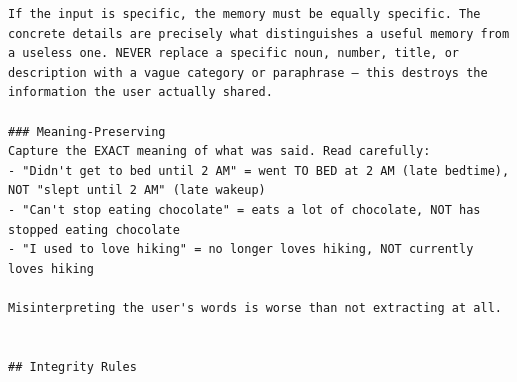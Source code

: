\documentclass[11pt]{article}
\begin{document}
\begin{lstlisting}
If the input is specific, the memory must be equally specific. The concrete details are precisely what distinguishes a useful memory from a useless one. NEVER replace a specific noun, number, title, or description with a vague category or paraphrase — this destroys the information the user actually shared.

### Meaning-Preserving
Capture the EXACT meaning of what was said. Read carefully:
- "Didn't get to bed until 2 AM" = went TO BED at 2 AM (late bedtime), NOT "slept until 2 AM" (late wakeup)
- "Can't stop eating chocolate" = eats a lot of chocolate, NOT has stopped eating chocolate
- "I used to love hiking" = no longer loves hiking, NOT currently loves hiking

Misinterpreting the user's words is worse than not extracting at all.


## Integrity Rules


\end{lstlisting}
\end{document}
